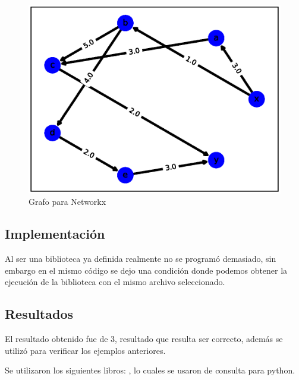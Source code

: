 \documentclass{report}
\begin{document}
\begin{figure}[h!t]
  \centering
\includegraphics[scale = 0.5]{ejemplo9.eps}
\caption{Grafo para Networkx}
\label{fig:3}  
\end{figure}

\subsection{Implementación}
Al ser una biblioteca ya definida realmente no se programó demasiado, sin embargo en el mismo código se dejo una condición donde podemos obtener la ejecución de la biblioteca con el mismo archivo seleccionado.

\subsection{Resultados}
El resultado obtenido fue de 3, resultado que resulta ser correcto, además se utilizó para verificar los ejemplos anteriores.

\vspace{1 cm}

Se utilizaron los siguientes libros:
\cite{chun2001core}
\cite{van1991guia}
\cite{van2017tutorial}, lo cuales se usaron de consulta para python.


\end{document}
